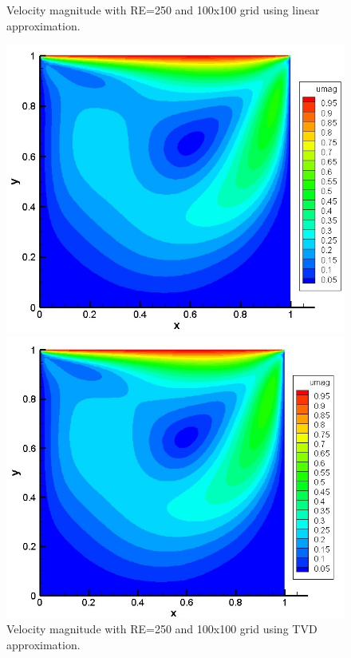 \documentclass[12pt]{elsarticle}
\begin{document}
	
	\begin{figure}[h]
		\caption{Velocity magnitude with RE=250 and 100x100 grid using linear approximation. }
		\centering\includegraphics[width=0.9\linewidth]{25_100_100_re_250_velocity_linear}
		\caption{Velocity magnitude with RE=250 and 100x100 grid using TVD approximation. }
		\centering\includegraphics[width=0.9\linewidth]{26_100_100_re_250_velocity_tvd}
	\end{figure}
	
\end{document}
